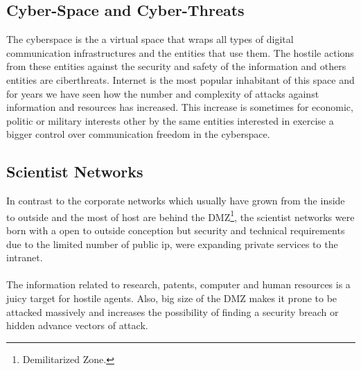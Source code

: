 \documentclass[a4paper]{llncs}
\begin{document}
\subsection{Cyber-Space and Cyber-Threats}
\label{sect:Scientist Networks}

The cyberspace is the a virtual space that wraps all types of digital communication infrastructures and the entities that use them. The hostile actions from these entities against the security and safety of the information and others entities are ciberthreats. Internet is the most popular inhabitant of this space and for years we have seen how the number and complexity of attacks against information and resources has increased. This increase is sometimes for economic, politic or military interests other by the same entities interested in exercise a bigger control over communication freedom in the cyberspace.


\subsection{Scientist Networks}
\label{sect:Scientist Networks}
In contrast to the corporate networks which usually have grown from the inside to outside and the most of host are behind the DMZ\footnote{Demilitarized Zone.}, the scientist networks were born with a open to outside conception but security and technical requirements due to the limited number of public ip, were expanding private services to the intranet.\\\\The information related to research, patents, computer and human resources is a juicy target for hostile agents. Also, big size of the DMZ makes it prone to be attacked massively and increases the possibility of finding a security breach or hidden advance vectors of attack.
\end{document}
